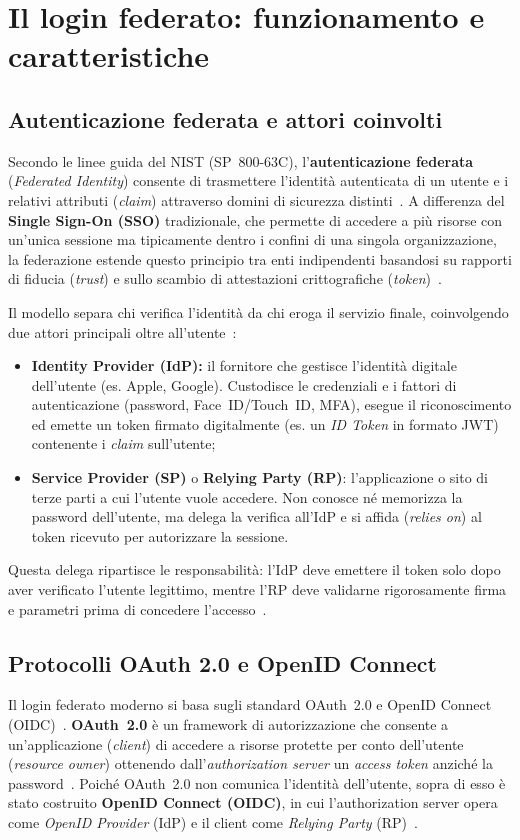 \section{Il login federato: funzionamento e caratteristiche}
\label{sec:contesto}

\subsection{Autenticazione federata e attori coinvolti}
Secondo le linee guida del NIST (SP~800-63C), l'\textbf{autenticazione federata} (\emph{Federated Identity}) consente di trasmettere l'identità autenticata di un utente e i relativi attributi (\emph{claim}) attraverso domini di sicurezza distinti~\cite{nist800-63c}. A differenza del \textbf{Single Sign-On (SSO)} tradizionale, che permette di accedere a più risorse con un'unica sessione ma tipicamente dentro i confini di una singola organizzazione, la federazione estende questo principio tra enti indipendenti basandosi su rapporti di fiducia (\emph{trust}) e sullo scambio di attestazioni crittografiche (\emph{token})~\cite{nist800-63c,openid-connect-core}.

Il modello separa chi verifica l'identità da chi eroga il servizio finale, coinvolgendo due attori principali oltre all'utente~\cite{nist800-63c,openid-connect-core}:
\begin{itemize}
    \item \textbf{Identity Provider (IdP):} il fornitore che gestisce l'identità digitale dell'utente (es. Apple, Google). Custodisce le credenziali e i fattori di autenticazione (password, Face~ID/Touch~ID, MFA), esegue il riconoscimento ed emette un token firmato digitalmente (es. un \emph{ID Token} in formato JWT) contenente i \emph{claim} sull'utente;
    \item \textbf{Service Provider (SP)} o \textbf{Relying Party (RP)}: l'applicazione o sito di terze parti a cui l'utente vuole accedere. Non conosce né memorizza la password dell'utente, ma delega la verifica all'IdP e si affida (\emph{relies on}) al token ricevuto per autorizzare la sessione.
\end{itemize}
Questa delega ripartisce le responsabilità: l'IdP deve emettere il token solo dopo aver verificato l'utente legittimo, mentre l'RP deve validarne rigorosamente firma e parametri prima di concedere l'accesso~\cite{nist800-63c,owasp-auth-cheatsheet}.

\subsection{Protocolli OAuth 2.0 e OpenID Connect}
Il login federato moderno si basa sugli standard OAuth~2.0 e OpenID Connect (OIDC)~\cite{rfc9700}. \textbf{OAuth~2.0} è un framework di autorizzazione che consente a un'applicazione (\emph{client}) di accedere a risorse protette per conto dell'utente (\emph{resource owner}) ottenendo dall'\emph{authorization server} un \emph{access token} anziché la password~\cite{rfc6749}. Poiché OAuth~2.0 non comunica l'identità dell'utente, sopra di esso è stato costruito \textbf{OpenID Connect (OIDC)}, in cui l'authorization server opera come \emph{OpenID Provider} (IdP) e il client come \emph{Relying Party} (RP)~\cite{openid-connect-core}.

